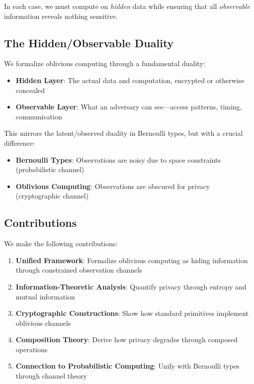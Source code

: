 \documentclass[11pt,final]{article}
\begin{document}
In each case, we must compute on \emph{hidden} data while ensuring that all \emph{observable} information reveals nothing sensitive.

\subsection{The Hidden/Observable Duality}

We formalize oblivious computing through a fundamental duality:

\begin{itemize}
    \item \textbf{Hidden Layer}: The actual data and computation, encrypted or otherwise concealed
    \item \textbf{Observable Layer}: What an adversary can see—access patterns, timing, communication
\end{itemize}

This mirrors the latent/observed duality in Bernoulli types, but with a crucial difference:
\begin{itemize}
    \item \textbf{Bernoulli Types}: Observations are noisy due to space constraints (probabilistic channel)
    \item \textbf{Oblivious Computing}: Observations are obscured for privacy (cryptographic channel)
\end{itemize}

\subsection{Contributions}

We make the following contributions:

\begin{enumerate}
    \item \textbf{Unified Framework}: Formalize oblivious computing as hiding information through constrained observation channels
    \item \textbf{Information-Theoretic Analysis}: Quantify privacy through entropy and mutual information
    \item \textbf{Cryptographic Constructions}: Show how standard primitives implement oblivious channels
    \item \textbf{Composition Theory}: Derive how privacy degrades through composed operations
    \item \textbf{Connection to Probabilistic Computing}: Unify with Bernoulli types through channel theory
\end{enumerate}
\end{document}
